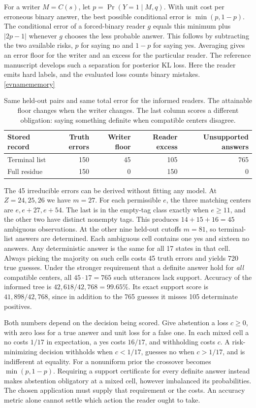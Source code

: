 \documentclass[11pt,letterpaper]{article}
\newcommand{\evref}[1]{\hyperlink{ev-#1}{\textsf{\small[\csname evname#1\endcsname]}}}
\begin{document}
For a writer \(M=C(s)\), let \(p=\Pr(Y=1\mid M,q)\). With unit cost per erroneous binary answer, the best possible conditional error is \(\min(p,1-p)\). The conditional error of a forced-binary reader \(g\) equals this minimum plus
\(\lvert 2p-1\rvert\) whenever \(g\) chooses the less probable answer. This follows by subtracting the two available risks, \(p\) for saying no and \(1-p\) for saying yes. Averaging gives an error floor for the writer and an excess for the particular reader. The reference manuscript develops such a separation for posterior KL loss. Here the reader emits hard labels, and the evaluated loss counts binary mistakes. \evref{memory}

\begin{table}[htbp]\centering\small
\caption{Same held-out pairs and same total error for the informed readers. The attainable floor changes when the writer changes. The last column scores a different obligation: saying something definite when compatible centers disagree.}
\label{tab:reader-risk}
\begin{tabular}{lrrrr}\toprule
Stored record & Truth errors & Writer floor & Reader excess & Unsupported answers\\\midrule
Terminal list & 150 & 45 & 105 & 765\\
Full residue & 150 & 0 & 150 & 0\\\bottomrule
\end{tabular}
\end{table}

The 45 irreducible errors can be derived without fitting any model. At \(Z=24,25,26\) we have \(m=27\). For each permissible \(e\), the three matching centers are \(e,e+27,e+54\). The last is in the empty-tag class exactly when \(e\ge11\), and the other two have distinct nonempty tags. This produces \(14+15+16=45\) ambiguous observations. At the other nine held-out cutoffs \(m=81\), so terminal-list answers are determined. Each ambiguous cell contains one yes and sixteen no answers. Any deterministic answer is the same for all 17 states in that cell. Always picking the majority on such cells costs 45 truth errors and yields 720 true guesses. Under the stronger requirement that a definite answer hold for \emph{all} compatible centers, all \(45\cdot17=765\) such utterances lack support. Accuracy of the informed tree is \(42{,}618/42{,}768=99.65\%\). Its exact support score is \(41{,}898/42{,}768\), since in addition to the 765 guesses it misses 105 determinate positives.

Both numbers depend on the decision being scored. Give abstention a loss \(c\ge0\), with zero loss for a true answer and unit loss for a false one. In each mixed cell a no costs \(1/17\) in expectation, a yes costs \(16/17\), and withholding costs \(c\). A risk-minimizing decision withholds when \(c<1/17\), guesses no when \(c>1/17\), and is indifferent at equality. For a nonuniform prior the crossover becomes \(\min(p,1-p)\). Requiring a support certificate for every definite answer instead makes abstention obligatory at a mixed cell, however imbalanced its probabilities. The chosen application must supply that requirement or the costs. An accuracy metric alone cannot settle which action the reader ought to take.
\end{document}
